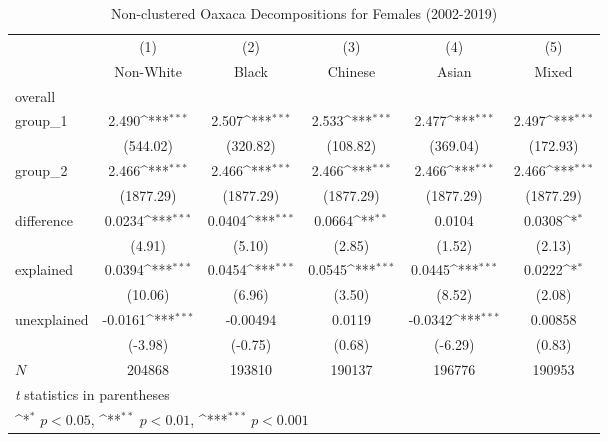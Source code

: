 \begin{table}[htbp]\centering
\def\sym#1{\ifmmode^{#1}\else\(^{#1}\)\fi}
\caption{Non-clustered Oaxaca Decompositions for Females (2002-2019)\label{tab1}}
\begin{tabular}{l*{5}{c}}
\hline\hline
            &\multicolumn{1}{c}{(1)}&\multicolumn{1}{c}{(2)}&\multicolumn{1}{c}{(3)}&\multicolumn{1}{c}{(4)}&\multicolumn{1}{c}{(5)}\\
            &\multicolumn{1}{c}{Non-White}&\multicolumn{1}{c}{Black}&\multicolumn{1}{c}{Chinese}&\multicolumn{1}{c}{Asian}&\multicolumn{1}{c}{Mixed}\\
\hline
overall     &                     &                     &                     &                     &                     \\
group\_1     &       2.490\sym{***}&       2.507\sym{***}&       2.533\sym{***}&       2.477\sym{***}&       2.497\sym{***}\\
            &    (544.02)         &    (320.82)         &    (108.82)         &    (369.04)         &    (172.93)         \\
group\_2     &       2.466\sym{***}&       2.466\sym{***}&       2.466\sym{***}&       2.466\sym{***}&       2.466\sym{***}\\
            &   (1877.29)         &   (1877.29)         &   (1877.29)         &   (1877.29)         &   (1877.29)         \\
difference  &      0.0234\sym{***}&      0.0404\sym{***}&      0.0664\sym{**} &      0.0104         &      0.0308\sym{*}  \\
            &      (4.91)         &      (5.10)         &      (2.85)         &      (1.52)         &      (2.13)         \\
explained   &      0.0394\sym{***}&      0.0454\sym{***}&      0.0545\sym{***}&      0.0445\sym{***}&      0.0222\sym{*}  \\
            &     (10.06)         &      (6.96)         &      (3.50)         &      (8.52)         &      (2.08)         \\
unexplained &     -0.0161\sym{***}&    -0.00494         &      0.0119         &     -0.0342\sym{***}&     0.00858         \\
            &     (-3.98)         &     (-0.75)         &      (0.68)         &     (-6.29)         &      (0.83)         \\
\hline
\(N\)       &      204868         &      193810         &      190137         &      196776         &      190953         \\
\hline\hline
\multicolumn{6}{l}{\footnotesize \textit{t} statistics in parentheses}\\
\multicolumn{6}{l}{\footnotesize \sym{*} \(p<0.05\), \sym{**} \(p<0.01\), \sym{***} \(p<0.001\)}\\
\end{tabular}
\label{tab:oaxaca_female_nonclustered}
\end{table}
